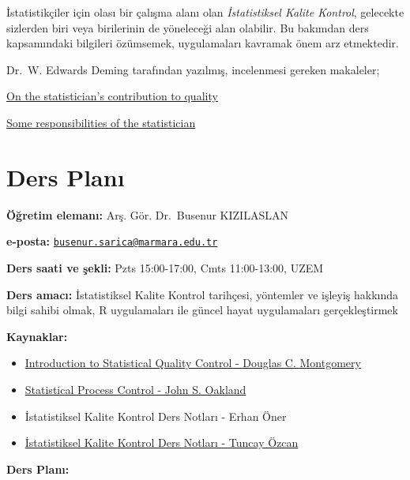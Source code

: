 \documentclass[
]{book}
\begin{document}
İstatistikçiler için olası bir çalışma alanı olan \emph{İstatistiksel Kalite Kontrol}, gelecekte sizlerden biri veya birilerinin de yöneleceği alan olabilir. Bu bakımdan ders kapsamındaki bilgileri özümsemek, uygulamaları kavramak önem arz etmektedir.

Dr.~W. Edwards Deming tarafından yazılmış, incelenmesi gereken makaleler;

\href{https://deming.org/wp-content/uploads/2020/06/On-The-Statisticians-Contribution-to-Quality-1987.pdf}{On the statistician's contribution to quality}

\href{https://deming.org/wp-content/uploads/2020/06/Some-Responsibilities-of-a-Statistician-1964.pdf}{Some responsibilities of the statistician}

\hypertarget{ders-planux131}{%
\chapter{Ders Planı}\label{ders-planux131}}

\textbf{Öğretim elemanı:} Arş. Gör. Dr.~Busenur KIZILASLAN

\textbf{e-posta:} \href{mailto:busenur.sarica@marmara.edu.tr}{\nolinkurl{busenur.sarica@marmara.edu.tr}}

\textbf{Ders saati ve şekli:} Pzts 15:00-17:00, Cmts 11:00-13:00, UZEM

\textbf{Ders amacı:} İstatistiksel Kalite Kontrol tarihçesi, yöntemler ve işleyiş hakkında bilgi sahibi olmak, R uygulamaları ile güncel hayat uygulamaları gerçekleştirmek

\textbf{Kaynaklar:}

\begin{itemize}
\item
  \href{http://endustri.eskisehir.edu.tr/ipoyraz/TKY302/icerik/text\%20book_montgomery_6th\%20edition.pdf}{Introduction to Statistical Quality Control - Douglas C. Montgomery}
\item
  \href{http://www.diliev.com/Home/materiali/KHEA/referati/6812268-Statistical-Process-Control-eBook-VG.pdf}{Statistical Process Control - John S. Oakland}
\item
  İstatistiksel Kalite Kontrol Ders Notları - Erhan Öner
\item
  \href{http://auzefkitap.istanbul.edu.tr/kitap/endustrimuhlt_ue/istatistikselkalitekontrolu.pdf}{İstatistiksel Kalite Kontrol Ders Notları - Tuncay Özcan}
\end{itemize}

\textbf{Ders Planı:}
\end{document}
